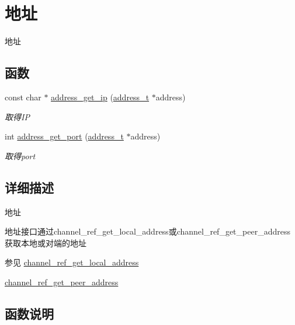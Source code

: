 \hypertarget{a00100}{}\section{地址}
\label{a00100}


地址  


\subsection*{函数}
\begin{DoxyCompactItemize}
\item 
const char $\ast$ \hyperlink{a00100_gac1cb1b6031c4a8a724d42e3ed01d1ba6_gac1cb1b6031c4a8a724d42e3ed01d1ba6}{address\+\_\+get\+\_\+ip} (\hyperlink{a00051_a7a6e75b85c8b441f843bd40004a7d9d5_a7a6e75b85c8b441f843bd40004a7d9d5}{address\+\_\+t} $\ast$address)
\begin{DoxyCompactList}\small\item\em 取得\+I\+P \end{DoxyCompactList}\item 
int \hyperlink{a00100_ga223a2192ce38fc5e79a73b5030a42e0e_ga223a2192ce38fc5e79a73b5030a42e0e}{address\+\_\+get\+\_\+port} (\hyperlink{a00051_a7a6e75b85c8b441f843bd40004a7d9d5_a7a6e75b85c8b441f843bd40004a7d9d5}{address\+\_\+t} $\ast$address)
\begin{DoxyCompactList}\small\item\em 取得port \end{DoxyCompactList}\end{DoxyCompactItemize}


\subsection{详细描述}
地址 


\begin{DoxyPre}
地址接口通过channel\_ref\_get\_local\_address或channel\_ref\_get\_peer\_address
获取本地或对端的地址
\end{DoxyPre}
 \begin{DoxySeeAlso}{参见}
\hyperlink{a00102_ga1dcf6af0c992fa21f9dcd03c8f763ec4_ga1dcf6af0c992fa21f9dcd03c8f763ec4}{channel\+\_\+ref\+\_\+get\+\_\+local\+\_\+address} 

\hyperlink{a00102_ga7bcafd2461a1edfde9c581cb946dcd44_ga7bcafd2461a1edfde9c581cb946dcd44}{channel\+\_\+ref\+\_\+get\+\_\+peer\+\_\+address} 
\end{DoxySeeAlso}


\subsection{函数说明}
\hypertarget{a00100_gac1cb1b6031c4a8a724d42e3ed01d1ba6_gac1cb1b6031c4a8a724d42e3ed01d1ba6}{}
